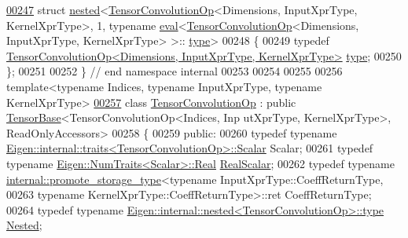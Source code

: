 \begin{DoxyCode}
\hyperlink{struct_eigen_1_1internal_1_1nested_3_01_tensor_convolution_op_3_01_dimensions_00_01_input_xpr_ty9d10111784dcaece5477fadf1d96c5f8}{00247} \textcolor{keyword}{struct }\hyperlink{struct_eigen_1_1internal_1_1nested}{nested}<\hyperlink{class_eigen_1_1_tensor_convolution_op}{TensorConvolutionOp}<Dimensions, InputXprType, KernelXprType>, 1, 
      typename \hyperlink{struct_eigen_1_1internal_1_1eval}{eval}<\hyperlink{class_eigen_1_1_tensor_convolution_op}{TensorConvolutionOp}<Dimensions, InputXprType, KernelXprType> >::
      \hyperlink{class_eigen_1_1_tensor_convolution_op}{type}>
00248 \{
00249   \textcolor{keyword}{typedef} \hyperlink{class_eigen_1_1_tensor_convolution_op}{TensorConvolutionOp<Dimensions, InputXprType, KernelXprType>}
       \hyperlink{class_eigen_1_1_tensor_convolution_op}{type};
00250 \};
00251 
00252 \}  \textcolor{comment}{// end namespace internal}
00253 
00254 
00255 
00256 \textcolor{keyword}{template}<\textcolor{keyword}{typename} Indices, \textcolor{keyword}{typename} InputXprType, \textcolor{keyword}{typename} KernelXprType>
\hyperlink{class_eigen_1_1_tensor_convolution_op}{00257} \textcolor{keyword}{class }\hyperlink{class_eigen_1_1_tensor_convolution_op}{TensorConvolutionOp} : \textcolor{keyword}{public} \hyperlink{class_eigen_1_1_tensor_base}{TensorBase}<TensorConvolutionOp<Indices, Inp
      utXprType, KernelXprType>, ReadOnlyAccessors>
00258 \{
00259   \textcolor{keyword}{public}:
00260   \textcolor{keyword}{typedef} \textcolor{keyword}{typename} \hyperlink{struct_eigen_1_1internal_1_1traits}{Eigen::internal::traits<TensorConvolutionOp>::Scalar}
       Scalar;
00261   \textcolor{keyword}{typedef} \textcolor{keyword}{typename} \hyperlink{group___sparse_core___module}{Eigen::NumTraits<Scalar>::Real} 
      \hyperlink{group___sparse_core___module}{RealScalar};
00262   \textcolor{keyword}{typedef} \textcolor{keyword}{typename} \hyperlink{struct_eigen_1_1internal_1_1promote__storage__type}{internal::promote\_storage\_type}<\textcolor{keyword}{typename} 
      InputXprType::CoeffReturnType,
00263                                                   \textcolor{keyword}{typename} KernelXprType::CoeffReturnType>::ret 
      CoeffReturnType;
00264   \textcolor{keyword}{typedef} \textcolor{keyword}{typename} \hyperlink{class_eigen_1_1internal_1_1_tensor_lazy_evaluator_writable}{Eigen::internal::nested<TensorConvolutionOp>::type}
       \hyperlink{class_eigen_1_1internal_1_1_tensor_lazy_evaluator_writable}{Nested};

\end{DoxyCode}
